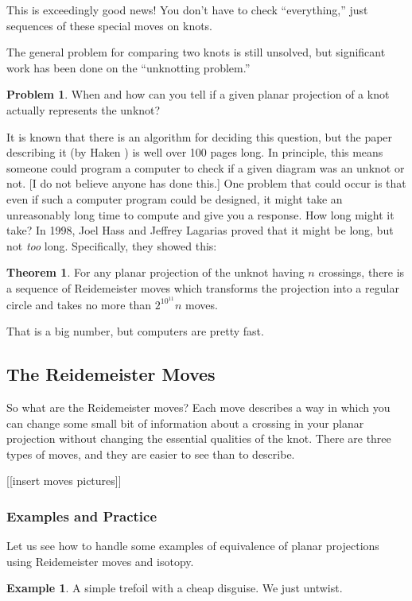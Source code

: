 \documentclass[12pt,letterpaper]{article}
\theoremstyle{definition}
\newtheorem{example}{Example}
\newtheorem*{theorem}{Theorem}
\newtheorem*{problem}{Problem}
\begin{document}
This is exceedingly good news! You don't have to check ``everything,'' just sequences of these special moves on knots.  

The general problem for comparing two knots is still unsolved, but significant work has been done on the ``unknotting problem.''
\begin{problem}
When and how can you tell if a given planar projection of a knot actually represents the unknot?
\end{problem}
It is known that there is an algorithm for deciding this question, but the paper describing it  (by Haken \cite{Haken}) is well over 100 pages long. In principle, this means someone could program a computer to check if a given diagram was an unknot or not. [I do not believe anyone has done this.] One problem that could occur is that even if such a computer program could be designed, it might take an unreasonably long time to compute and give you a response. How long might it take? In 1998, Joel Hass and Jeffrey Lagarias proved that it might be long, but not \emph{too} long. Specifically, they showed this:
\begin{theorem}
For any planar projection of the unknot having $n$ crossings, there is a sequence of Reidemeister moves which transforms the projection into a regular circle and takes no more than $2^{10^11}n$ moves.
\end{theorem}

That is a big number, but computers are pretty fast.

\subsection*{The Reidemeister Moves}

So what are the Reidemeister moves? Each move describes a way in which you can change some small bit of information about a crossing in your planar projection without changing the essential qualities of the knot. There are three types of moves, and they are easier to see than to describe.

[[insert moves pictures]]


\subsubsection*{Examples and Practice} 

Let us see how to handle some examples of equivalence of planar projections using Reidemeister moves and isotopy.

\begin{example} 
A simple trefoil with a cheap disguise.
We just untwist.
\end{example}
\end{document}
